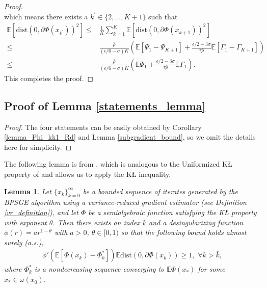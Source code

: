 \documentclass[letterpaper]{article} %
\newtheorem{lemma}{Lemma}
\begin{document}
\begin{proof}
\[		\]
		which means  there exists a  $k^{\prime} \in\{2,\dots,K+1\}$ such that
		\begin{align*}
			\mathbb{E}[\mathrm{dist}(0,\partial\Phi(x_{k^{\prime}}))^{2}]\le&\frac{1}{K}\sum_{k=1}^{K}\mathbb{E}[\mathrm{dist}(0,\partial\Phi(x_{k+1}))^{2}]\\
			\le&\frac{\bar{\rho}}{(\epsilon/6-\sigma)K}(\mathbb{E}[\Psi_{1}-\Psi_{K+1}]+\frac{\epsilon/2-3\sigma}{\tau\bar{\rho}}\mathbb{E}[\Gamma_{1}-\Gamma_{K+1}])\\
			\le&\frac{\bar{\rho}}{(\epsilon/6-\sigma)K}(\mathbb{E}\Psi_{1}+\frac{\epsilon/2-3\sigma}{\tau\bar{\rho}}\mathbb{E}\Gamma_{1}).
		\end{align*}
		This completes the proof.
	\end{proof}
	
	\subsection{Proof of  Lemma \ref{statements_lemma}}
	\begin{proof}
		The four statements can be easily obtained by Corollary \ref{lemma_Phi_kk1_Rd} and Lemma \ref{subgradient_bound}, so we omit the details here for simplicity.
	\end{proof}
	The following lemma is from \cite{DriggsTLDS2020}, which is analogous to the Uniformized K{\L} property of \cite{BolteST14} and allows us to apply the K{\L} inequality.
	\begin{lemma}\label{E_KL_inequality}
		Let $\{x_{k}\}_{k=0}^{\infty}$ be a bounded sequence of iterates generated by the BPSGE algorithm using a variance-reduced gradient estimator (see Definition \ref{vr_definition}), and let $\Phi$ be a semialgebraic function satisfying the K{\L} property \cite{BolteST14} with exponent $\theta$. Then there exists an index $\bar{k}$ and a desingularizing function $\phi(r) = ar^{1-\theta}$ with $a>0$, $\theta\in[0,1)$  so that the following bound holds almost surely (a.s.),
		\begin{eqnarray}
			\phi'(\mathbb{E}[\Phi(x_{k})-\Phi_{k}^{*}])\mathbb{E}\mbox{dist}(0,\partial\Phi(x_{k}))\ge 1,\,\,\forall k>\bar{k},
		\end{eqnarray}
		where $\Phi_{k}^{*}$ is a nondecreasing sequence  converging to $\mathbb{E}\Phi(x_{*})$ for some $x_{*}\in\omega(x_{0})$.
	\end{lemma}
	
\end{document}
